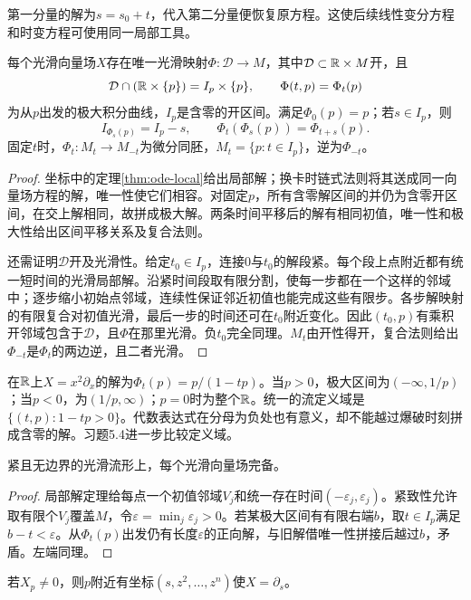 第一分量的解为$s=s_0+t$，代入第二分量便恢复原方程。这使后续线性变分方程和时变方程可使用同一局部工具。
\begin{theorem}[极大局部流]\label{thm:local-flow}
每个光滑向量场$X$存在唯一光滑映射$\Phi:\mathcal D\to M$，其中$\mathcal D\subset\mathbb{R}\times M$开，且
\[
 \mathcal D\cap(\mathbb{R}\times\{p\})=I_p\times\{p\},\qquad
 \Phi(t,p)=\Phi_t(p)
\]
为从$p$出发的极大积分曲线，$I_p$是含零的开区间。满足$\Phi_0(p)=p$；若$s\in I_p$，则
\[
 I_{\Phi_s(p)}=I_p-s,\qquad
 \Phi_t(\Phi_s(p))=\Phi_{t+s}(p).
\]
固定$t$时，$\Phi_t:M_t\to M_{-t}$为微分同胚，$M_t=\{p:t\in I_p\}$，逆为$\Phi_{-t}$。
\end{theorem}
\begin{proof}
坐标中的定理\ref{thm:ode-local}给出局部解；换卡时链式法则将其送成同一向量场方程的解，唯一性使它们相容。对固定$p$，所有含零解区间的并仍为含零开区间，在交上解相同，故拼成极大解。两条时间平移后的解有相同初值，唯一性和极大性给出区间平移关系及复合法则。

还需证明$\mathcal D$开及光滑性。给定$t_0\in I_p$，连接$0$与$t_0$的解段紧。每个段上点附近都有统一短时间的光滑局部解。沿紧时间段取有限分割，使每一步都在一个这样的邻域中；逐步缩小初始点邻域，连续性保证邻近初值也能完成这些有限步。各步解映射的有限复合对初值光滑，最后一步的时间还可在$t_0$附近变化。因此$(t_0,p)$有乘积开邻域包含于$\mathcal D$，且$\Phi$在那里光滑。负$t_0$完全同理。$M_t$由开性得开，复合法则给出$\Phi_{-t}$是$\Phi_t$的两边逆，且二者光滑。
\end{proof}
\begin{example}[局部流不等于全局群]
在$\mathbb{R}$上$X=x^2\partial_x$的解为$\Phi_t(p)=p/(1-tp)$。当$p>0$，极大区间为$(-\infty,1/p)$；当$p<0$，为$(1/p,\infty)$；$p=0$时为整个$\mathbb{R}$。统一的流定义域是$\{(t,p):1-tp>0\}$。代数表达式在分母为负处也有意义，却不能越过爆破时刻拼成含零的解。习题5.4进一步比较定义域。
\end{example}
\begin{proposition}[紧流形上的完备性]\label{prop:compact-complete}
紧且无边界的光滑流形上，每个光滑向量场完备。
\end{proposition}
\begin{proof}
局部解定理给每点一个初值邻域$V_j$和统一存在时间$(-\varepsilon_j,\varepsilon_j)$。紧致性允许取有限个$V_j$覆盖$M$，令$\varepsilon=\min_j\varepsilon_j>0$。若某极大区间有有限右端$b$，取$t\in I_p$满足$b-t<\varepsilon$。从$\Phi_t(p)$出发仍有长度$\varepsilon$的正向解，与旧解借唯一性拼接后越过$b$，矛盾。左端同理。
\end{proof}
\begin{theorem}[流盒定理]\label{thm:flow-box}
若$X_p\ne0$，则$p$附近有坐标$(s,z^2,\ldots,z^n)$使$X=\partial_s$。
\end{theorem}

